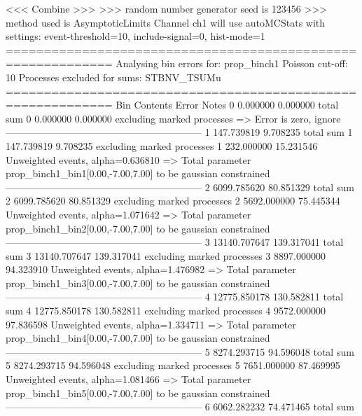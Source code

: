  <<< Combine >>> 
>>> random number generator seed is 123456
>>> method used is AsymptoticLimits
Channel ch1 will use autoMCStats with settings: event-threshold=10, include-signal=0, hist-mode=1
============================================================
Analysing bin errors for: prop_binch1
Poisson cut-off: 10
Processes excluded for sums: STBNV_TSUMu
============================================================
Bin        Contents        Error           Notes                         
0          0.000000        0.000000        total sum                     
0          0.000000        0.000000        excluding marked processes    
  => Error is zero, ignore      
------------------------------------------------------------
1          147.739819      9.708235        total sum                     
1          147.739819      9.708235        excluding marked processes    
1          232.000000      15.231546       Unweighted events, alpha=0.636810
  => Total parameter prop_binch1_bin1[0.00,-7.00,7.00] to be gaussian constrained
------------------------------------------------------------
2          6099.785620     80.851329       total sum                     
2          6099.785620     80.851329       excluding marked processes    
2          5692.000000     75.445344       Unweighted events, alpha=1.071642
  => Total parameter prop_binch1_bin2[0.00,-7.00,7.00] to be gaussian constrained
------------------------------------------------------------
3          13140.707647    139.317041      total sum                     
3          13140.707647    139.317041      excluding marked processes    
3          8897.000000     94.323910       Unweighted events, alpha=1.476982
  => Total parameter prop_binch1_bin3[0.00,-7.00,7.00] to be gaussian constrained
------------------------------------------------------------
4          12775.850178    130.582811      total sum                     
4          12775.850178    130.582811      excluding marked processes    
4          9572.000000     97.836598       Unweighted events, alpha=1.334711
  => Total parameter prop_binch1_bin4[0.00,-7.00,7.00] to be gaussian constrained
------------------------------------------------------------
5          8274.293715     94.596048       total sum                     
5          8274.293715     94.596048       excluding marked processes    
5          7651.000000     87.469995       Unweighted events, alpha=1.081466
  => Total parameter prop_binch1_bin5[0.00,-7.00,7.00] to be gaussian constrained
------------------------------------------------------------
6          6062.282232     74.471465       total sum                     
